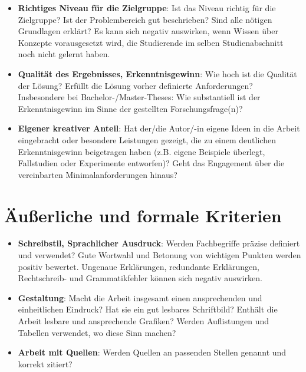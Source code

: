 \begin{itemize}
	    \item \textbf{Richtiges Niveau für die Zielgruppe}: Ist das Niveau richtig für die Zielgruppe? Ist der Problembereich gut beschrieben? Sind alle nötigen Grundlagen erklärt? Es kann sich negativ auswirken, wenn Wissen über Konzepte vorausgesetzt wird, die Studierende im selben Studienabschnitt noch nicht gelernt haben.

        \item \textbf{Qualität des Ergebnisses, Erkenntnisgewinn}: Wie hoch ist die Qualität der Lösung? Erfüllt die Lösung vorher definierte Anforderungen? Insbesondere bei Bachelor-/Master-Theses: Wie substantiell ist der Erkenntnisgewinn im Sinne der gestellten Forschungsfrage(n)?
        
        \item \textbf{Eigener kreativer Anteil}: 
        Hat der/die Autor/-in eigene Ideen in die Arbeit eingebracht oder besondere Leistungen gezeigt, die zu einem deutlichen Erkenntnisgewinn beigetragen haben (z.B. eigene Beispiele überlegt, Fallstudien oder Experimente entworfen)? Geht das Engagement über die vereinbarten Minimalanforderungen hinaus?
        
    \end{itemize}
	
\section{Äußerliche und formale Kriterien}

    \begin{itemize}

	    \item \textbf{Schreibstil, Sprachlicher Ausdruck}: Werden Fachbegriffe präzise definiert und verwendet? Gute Wortwahl und Betonung von wichtigen Punkten werden positiv bewertet. Ungenaue Erklärungen, redundante Erklärungen, Rechtschreib- und Grammatikfehler können sich negativ auswirken.
	    
    	\item \textbf{Gestaltung}: Macht die Arbeit insgesamt einen ansprechenden und einheitlichen Eindruck? Hat sie ein gut lesbares Schriftbild? Enthält die Arbeit lesbare und ansprechende Grafiken? Werden Auflistungen und Tabellen verwendet, wo diese Sinn machen?
	
    	\item \textbf{Arbeit mit Quellen}: Werden Quellen an passenden Stellen genannt und korrekt zitiert?
    \end{itemize}
    
